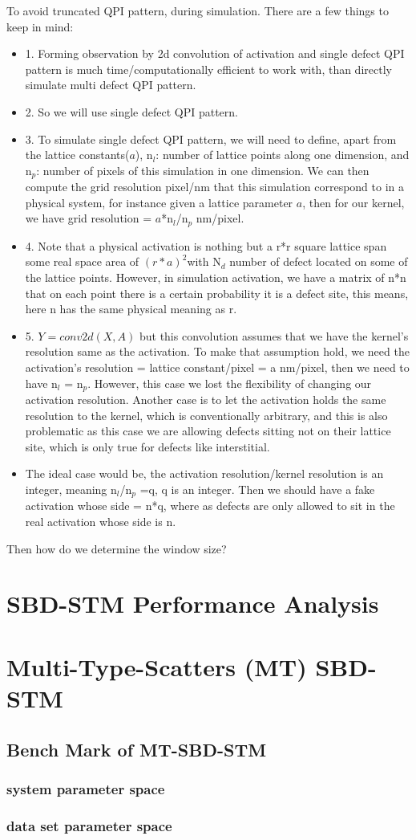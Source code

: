 To avoid truncated QPI pattern, during simulation. There are a few things to keep in mind: 
\begin{itemize}
	\item 1. Forming observation by 2d convolution of activation and single defect QPI pattern is much time/computationally efficient to work with, than directly simulate multi defect QPI pattern. 
	\item 2. So we will use single defect QPI pattern. 
	\item 3. To simulate single defect QPI pattern, we will need to define, apart from the lattice constants($a$), n$_l$: number of lattice points along one dimension, and n$_p$: number of pixels of this simulation in one dimension. We can then compute the grid resolution pixel/nm that this simulation correspond to in a physical system, for instance given a lattice parameter $a$, then for our kernel, we have grid resolution = $a$*n$_l$/n$_p$ nm/pixel.
	\item 4. Note that a physical activation is nothing but a r*r square lattice span some real space area of $(r*a)^2$with N$_d$ number of defect located on some of the lattice points. However, in simulation activation, we have a matrix of n*n that on each point there is a certain probability it is a defect site, this means, here n has the same physical meaning as r.
	\item 5. $Y=conv2d(X,A)$ but this convolution assumes that we have the kernel's resolution same as the activation. To make that assumption hold, we need the activation's resolution = lattice constant/pixel = a nm/pixel, then we need to have n$_l$ = n$_p$. However, this case we lost the flexibility of changing our activation resolution. Another case is to let the activation holds the same resolution to the kernel, which is conventionally arbitrary, and this is also problematic as this case we are allowing defects sitting not on their lattice site, which is only true for defects like interstitial.
	\item The ideal case would be, the  activation resolution/kernel resolution is an integer, meaning n$_l$/n$_p$ =q, q is an integer. Then we should have a fake activation whose side = n*q, where as defects are only allowed to sit in the real activation whose side is n.
\end{itemize}
Then how do we determine the window size?  
\section{SBD-STM Performance Analysis}

\section{Multi-Type-Scatters (MT) SBD-STM}


\subsection{Bench Mark of MT-SBD-STM}

\subsubsection{system parameter space}

\subsubsection{data set parameter space}
